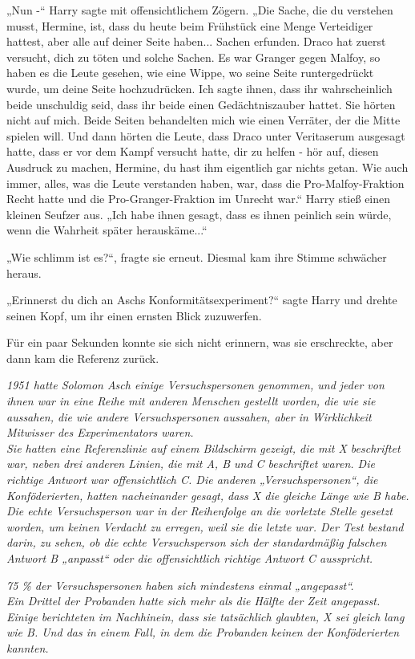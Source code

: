 {„Nun -“ Harry sagte mit offensichtlichem Zögern. „Die Sache, die du verstehen musst, Hermine, ist, dass du heute beim Frühstück eine Menge Verteidiger hattest, aber alle auf deiner Seite haben... Sachen erfunden. Draco hat zuerst versucht, dich zu töten und solche Sachen. Es war Granger gegen Malfoy, so haben es die Leute gesehen, wie eine Wippe, wo seine Seite runtergedrückt wurde, um deine Seite hochzudrücken. Ich sagte ihnen, dass ihr wahrscheinlich beide unschuldig seid, dass ihr beide einen Gedächtniszauber hattet. Sie hörten nicht auf mich. Beide Seiten behandelten mich wie einen Verräter, der die Mitte spielen will. Und dann hörten die Leute, dass Draco unter Veritaserum ausgesagt hatte, dass er vor dem Kampf versucht hatte, dir zu helfen - hör auf, diesen Ausdruck zu machen, Hermine, du hast ihm eigentlich gar nichts getan. Wie auch immer, alles, was die Leute verstanden haben, war, dass die Pro-Malfoy-Fraktion Recht hatte und die Pro-Granger-Fraktion im Unrecht war.“ Harry stieß einen kleinen Seufzer aus. „Ich habe ihnen gesagt, dass es ihnen peinlich sein würde, wenn die Wahrheit später herauskäme...“

„Wie schlimm ist es?“, fragte sie erneut. Diesmal kam ihre Stimme schwächer heraus.

„Erinnerst du dich an Aschs Konformitätsexperiment?“ sagte Harry und drehte seinen Kopf, um ihr einen ernsten Blick zuzuwerfen.

Für ein paar Sekunden konnte sie sich nicht erinnern, was sie erschreckte, aber dann kam die Referenz zurück.

\emph{1951 hatte Solomon Asch einige Versuchspersonen genommen, und jeder von ihnen war in eine Reihe mit anderen Menschen gestellt worden, die wie sie aussahen, die wie andere Versuchspersonen aussahen, aber in Wirklichkeit Mitwisser des Experimentators waren.}\\ \emph{Sie hatten eine Referenzlinie auf einem Bildschirm gezeigt, die mit X beschriftet war, neben drei anderen Linien, die mit A, B und C beschriftet waren. Die richtige Antwort war offensichtlich C. Die anderen „Versuchspersonen“, die Konföderierten, hatten nacheinander gesagt, dass X die gleiche Länge wie B habe. Die echte Versuchsperson war in der Reihenfolge an die vorletzte Stelle gesetzt worden, um keinen Verdacht zu erregen, weil sie die letzte war. Der Test bestand darin, zu sehen, ob die echte Versuchsperson sich der standardmäßig falschen Antwort B „anpasst“ oder die offensichtlich richtige Antwort C ausspricht.}

\emph{75 \% der Versuchspersonen haben sich mindestens einmal „angepasst“.}\\ \emph{Ein Drittel der Probanden hatte sich mehr als die Hälfte der Zeit angepasst.}\\ \emph{Einige berichteten im Nachhinein, dass sie tatsächlich glaubten, X sei gleich lang wie B. Und das in einem Fall, in dem die Probanden keinen der Konföderierten kannten.}

}
